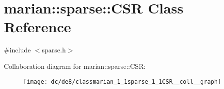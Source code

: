 \hypertarget{classmarian_1_1sparse_1_1CSR}{}\section{marian\+:\+:sparse\+:\+:C\+SR Class Reference}
\label{classmarian_1_1sparse_1_1CSR}


{\ttfamily \#include $<$sparse.\+h$>$}



Collaboration diagram for marian\+:\+:sparse\+:\+:C\+SR\+:
\nopagebreak
\begin{figure}[H]
\begin{center}
\leavevmode
\texttt{[image: dc/de8/classmarian\_1\_1sparse\_1\_1CSR\_\_coll\_\_graph]}
\end{center}
\end{figure}
